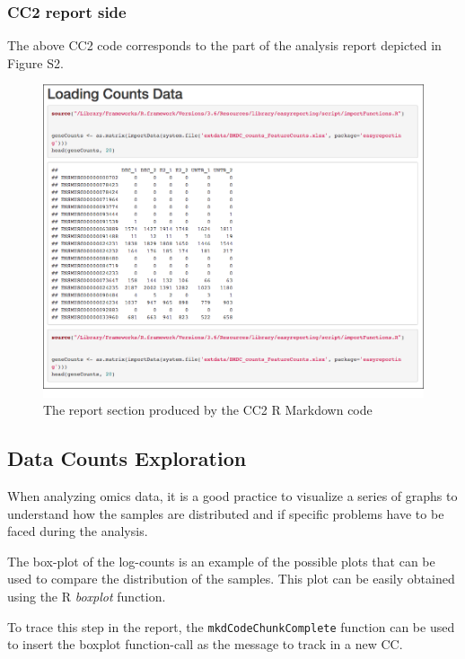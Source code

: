\documentclass[]{article}
\begin{document}
\hypertarget{cc2-report-side}{%
\subsubsection{CC2 report side}\label{cc2-report-side}}

The above CC2 code corresponds to the part of the analysis report
depicted in Figure S2.

\begin{figure}[ht]

{\centering \includegraphics[width=0.95\linewidth]{imgs/21} 

}

\caption{The report section produced by the CC2 R Markdown code}\label{fig:unnamed-chunk-6}
\end{figure}

\hypertarget{data-counts-exploration}{%
\subsection{Data Counts Exploration}\label{data-counts-exploration}}

When analyzing omics data, it is a good practice to visualize a series
of graphs to understand how the samples are distributed and if specific
problems have to be faced during the analysis.

The box-plot of the log-counts is an example of the possible plots that
can be used to compare the distribution of the samples. This plot can be
easily obtained using the R \emph{boxplot} function.

To trace this step in the report, the \texttt{mkdCodeChunkComplete}
function can be used to insert the boxplot function-call as the message
to track in a new CC.
\end{document}
